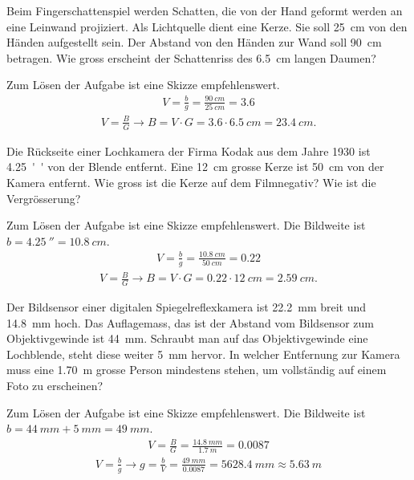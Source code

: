 \documentclass[paper=a4,twoside=true,,DIV13,BCOR1cm]{scrartcl}
\begin{document}
\begin{aufgabe}
	Beim Fingerschattenspiel werden Schatten, die von der Hand geformt werden an eine Leinwand projiziert.
	Als Lichtquelle dient eine Kerze. Sie soll \SI{25}{cm} von den Händen aufgestellt sein. Der Abstand von
	den Händen zur Wand soll \SI{90}{cm} betragen. Wie gross erscheint der Schattenriss des \SI{6.5}{cm} langen Daumen?
	\begin{loesung}
		Zum Lösen der Aufgabe ist eine Skizze empfehlenswert.
		\begin{eqnarray*}
			V=\frac{b}{g}=\frac{\SI{90}{cm}}{\SI{25}{cm}}=\num{3.6}
		\end{eqnarray*}
		\begin{eqnarray*}
			V=\frac{B}{G}\to B=V\cdot G = \num{3.6}\cdot\SI{6.5}{cm}=\SI{23.4}{cm}\text{.}
		\end{eqnarray*}
	\end{loesung}
\end{aufgabe}

\begin{aufgabe}
	Die Rückseite einer Lochkamera der Firma Kodak aus dem Jahre 1930 ist \SI{4.25}{''} von der Blende entfernt.
	Eine \SI{12}{cm} grosse Kerze ist \SI{50}{cm} von der Kamera entfernt. Wie gross ist die Kerze auf dem Filmnegativ?
	Wie ist die Vergrösserung?
	\begin{loesung}
		Zum Lösen der Aufgabe ist eine Skizze empfehlenswert.
		Die Bildweite ist $b=\SI{4.25}{''}=\SI{10.8}{cm}$.
		\begin{eqnarray*}
			V=\frac{b}{g}=\frac{\SI{10.8}{cm}}{\SI{50}{cm}}=\num{0.22}
		\end{eqnarray*}
		\begin{eqnarray*}
			V=\frac{B}{G}\to B=V\cdot G = \num{0.22}\cdot\SI{12}{cm}=\SI{2.59}{cm}\text{.}
		\end{eqnarray*}
	\end{loesung}
\end{aufgabe}

\begin{aufgabe}
	Der Bildsensor einer digitalen Spiegelreflexkamera ist \SI{22,2}{mm} breit und \SI{14,8}{mm} hoch.
	Das Auflagemass, das ist der Abstand vom Bildsensor zum Objektivgewinde ist \SI{44}{mm}.
	Schraubt man auf das Objektivgewinde eine Lochblende, steht diese weiter \SI{5}{mm} hervor.
	In welcher Entfernung zur Kamera muss eine \SI{1,70}{m} grosse Person mindestens stehen, um vollständig auf einem Foto zu erscheinen?
	\begin{loesung}
		Zum Lösen der Aufgabe ist eine Skizze empfehlenswert.
		Die Bildweite ist $b=\SI{44}{mm}+\SI{5}{mm}=\SI{49}{mm}$.
		\begin{eqnarray*}
			V=\frac{B}{G}=\frac{\SI{14.8}{mm}}{\SI{1.7}{m}}=\num{0.0087}
		\end{eqnarray*}
		\begin{eqnarray*}
			V=\frac{b}{g}\to g=\frac{b}{V}=\frac{\SI{49}{mm}}{\num{0.0087}}=\SI{5628.4}{mm} \approx\SI{5.63}{m}
		\end{eqnarray*}
	\end{loesung}
\end{aufgabe}
\end{document}

